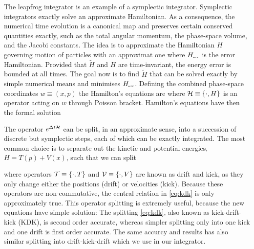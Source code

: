 The leapfrog integrator is an example of a symplectic integrator. Symplectic integrators exactly solve an approximate Hamiltonian. As a consequence, the numerical time evolution is a canonical map and preserves certain conserved quantities exactly, such as the total angular momentum, the phase-space volume, and the Jacobi constants. The idea is to approximate the Hamiltonian \(H\) governing motion of particles with an approximat one
where \(H_\text{\tiny err}\) is the error Hamiltonian. Provided that \(\tilde H\) and \(H\) are time-invariant, the energy error is bounded at all times. The goal now is to find \(\tilde H\) that can be solved exactly by simple numerical means and minimises \(H_\text{\tiny err}\). Defining the combined phase-space coordinates \(w\equiv(x,p)\) the Hamilton’s equations are
where \(\mathcal{H}\equiv\{\cdot,H\}\) is an operator acting on \(w\) through Poisson bracket. Hamilton’s equations have then the formal solution
\begin{sloppypar}
The operator \(e^{\Delta t\mathcal{H}}\) can be split, in an approximate sense, into a succession of discrete but symplectic steps, each of which can be exactly integrated. The most common choice is to separate out the kinetic and potential energies, \({H=T(p)+V(x)}\), such that we can split
\end{sloppypar}
where operators \(\mathcal{T}\equiv\{\cdot,T\}\) and \(\mathcal{V}\equiv\{\cdot,V\}\) are known as drift and kick, as they only change either the positions (drift) or velocities (kick). Because these operators are non-commutative, the central relation in \eqref{eq:kdk} is only approximately true. This operator splitting is extremely useful, because the new equations have simple solution:
The splitting \eqref{eq:kdk}, also known as kick-drift-kick (KDK), is second order accurate, whereas simpler splitting only into one kick and one drift is first order accurate. The same accurcy and results has also similar splitting into drift-kick-drift which we use in our integrator.
